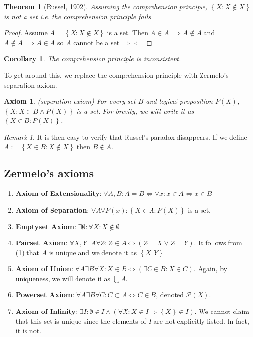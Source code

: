 \documentclass{article}
\renewcommand\O{\ensuremath{\emptyset}}
\newcommand\cont{\Rightarrow\!\Leftarrow}
\newtheorem{theorem}{Theorem}[section]
\newtheorem{axiom}{Axiom}[subsection]
\newtheorem{corollary}{Corollary}[theorem]
\theoremstyle{definition}
\theoremstyle{remark}
\newtheorem*{remark}{Remark}
\theoremstyle{plain}
\begin{document}
\begin{theorem}[Russel, 1902]
    Assuming the comprehension principle, $\left\{ X : X \notin X \right\}$ is not a set i.e. the comprehension principle fails.
\end{theorem}

\begin{proof}
    Assume $A = \left\{ X : X \notin X \right\}$ is a set. Then $A \in A \implies A \notin A$ and $A \notin A \implies A \in A$ so $A$ cannot be a set $\cont$
\end{proof}

\begin{corollary}
    The comprehension principle is inconsistent.
\end{corollary}

To get around this, we replace the comprehension principle with Zermelo's separation axiom. 

\begin{axiom}(separation axiom)
    For every set $B$ and logical proposition $P(X)$, $\left\{ X: X \in B \land P(X) \right\}$ is a set. For brevity, we will write it as $\left\{ X \in B : P(X) \right\}$.
\end{axiom}

\begin{remark}
    It is then easy to verify that Russel's paradox disappears. If we define $A:= \left\{X\in B: X \notin X  \right\}$ then $B \notin A$.
\end{remark}

\subsection{Zermelo's axioms}

\begin{enumerate}
    \item \textbf{Axiom of Extensionality}: \(\forall A,B: A=B \iff \forall x: x\in A \iff x \in B\)
    \item \textbf{Axiom of Separation}: \(\forall A \forall P(x):\left\{ X\in A : P(X) \right\}\) is a set. 
    \item \textbf{Emptyset Axiom}: \(\exists \O : \forall X: X \notin \O\)
    \item \textbf{Pairset Axiom}: \(\forall X, Y \exists A \forall Z: Z \in A \iff (Z=X \lor Z = Y)\). It follows from (1) that $A$ is unique and we denote it as \(\left\{ X,Y \right\}\)
    \item \textbf{Axiom of Union}: \(\forall A \exists B \forall X: X \in B\iff (\exists C \in B: X \in C)\). Again, by uniqueness, we will denote it as \(\bigcup A\).
    \item \textbf{Powerset Axiom}: \(\forall A \exists B \forall C: C \subset A \iff C\in B\), denoted \(\mathcal{P}(X)\).
    \item \textbf{Axiom of Infinity}: \(\exists I : \O \in I \land (\forall X: X\in I \Rightarrow \left\{ X \right\} \in I)\). We cannot claim that this set is unique since the elements of $I$ are not explicitly listed. In fact, it is not. 
\end{enumerate}
\end{document}
